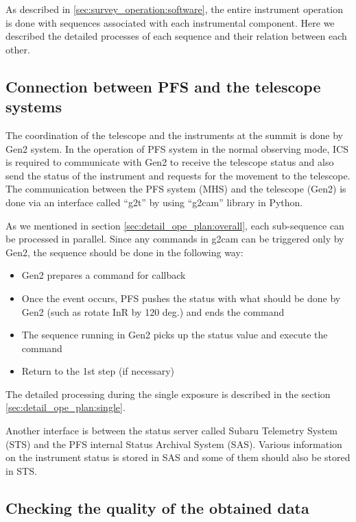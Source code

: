\documentclass[a4paper]{article}
\begin{document}
As described in \ref{sec:survey_operation:software}, the entire instrument operation is done with sequences associated with each instrumental component. Here we described the detailed processes of each sequence and their relation between each other.

\subsection{Connection between PFS and the telescope systems}
The coordination of the telescope and the instruments at the summit is done by Gen2 system. In the operation of PFS system in the normal observing mode, ICS is required to communicate with Gen2 to receive the telescope status and also send the status of the instrument and requests for the movement to the telescope. The communication between the PFS system (MHS) and the telescope (Gen2) is done via an interface called ``g2t'' by using ``g2cam'' library in Python.

As we mentioned in section \ref{sec:detail_ope_plan:overall}, each sub-sequence can be processed in parallel. Since any commands in g2cam can be triggered only by Gen2, the sequence should be done in the following way:
\begin{itemize}
\item Gen2 prepares a command for callback
\item Once the event occurs, PFS pushes the status with what should be done by Gen2 (such as rotate InR by 120 deg.) and ends the command
\item The sequence running in Gen2 picks up the status value and execute the command
\item Return to the 1st step (if necessary)
\end{itemize}
The detailed processing during the single exposure is described in the section \ref{sec:detail_ope_plan:single}.

Another interface is between the status server called Subaru Telemetry System (STS) and the PFS internal Status Archival System (SAS). Various information on the instrument status is stored in SAS and some of them should also be stored in STS.

\subsection{Checking the quality of the obtained data}
\end{document}
